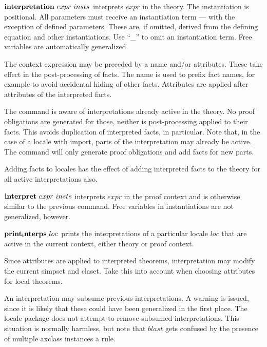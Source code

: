 \begin{descr}

\item [${\mathord{\mathbf{interpretation}}}~expr~insts$]
  interprets $expr$ in the theory.  The instantiation is positional.
  All parameters must receive an instantiation term --- with the
  exception of defined parameters.  These are, if omitted, derived
  from the defining equation and other instantiations.  Use ``\_'' to
  omit an instantiation term.  Free variables are automatically
  generalized.

  The context expression may be preceded by a name and/or attributes.
  These take effect in the post-processing of facts.  The name is used
  to prefix fact names, for example to avoid accidental hiding of
  other facts.  Attributes are applied after attributes of the
  interpreted facts.

  The command is aware of interpretations already active in the
  theory.  No proof obligations are generated for those, neither is
  post-processing applied to their facts.  This avoids duplication of
  interpreted facts, in particular.  Note that, in the case of a
  locale with import, parts of the interpretation may already be
  active.  The command will only generate proof obligations and add
  facts for new parts.

  Adding facts to locales has the
  effect of adding interpreted facts to the theory for all active
  interpretations also.
  
\item [${\mathord{\mathbf{interpret}}}~expr~insts$]
  interprets $expr$ in the proof context and is otherwise similar to
  the previous command.  Free variables in instantiations are not
  generalized, however.

\item [${\mathord{\mathbf{print_interps}}}~loc$]
  prints the interpretations of a particular locale $loc$ that are
  active in the current context, either theory or proof context.
  
\end{descr}

\begin{warn}
  Since attributes are applied to interpreted theorems, interpretation
  may modify the current simpset and claset.  Take this into
  account when choosing attributes for local theorems.
\end{warn}

\begin{warn}
  An interpretation may subsume previous interpretations.  A warning
  is issued, since it is likely that these could have been generalized
  in the first place.  The locale package does not attempt to remove
  subsumed interpretations.  This situation is normally harmless, but
  note that $blast$ gets confused by the presence of multiple axclass
  instances a rule.
\end{warn}


